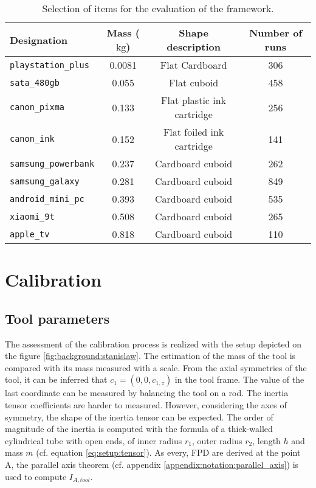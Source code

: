 \documentclass[/home/francois/latex/report/main.tex]{subfiles}
\begin{document}
\begin{table}[h]
  \begin{center}
    \renewcommand{\arraystretch}{1.2} %
    \begin{tabular}{l|c|c|c} %
      \textbf{Designation} & \textbf{Mass ($\si{\kilogram}$)} & \textbf{Shape description} & \textbf{Number of runs}\\
      \hline
      \texttt{playstation\_plus}  & 0.0081 & Flat Cardboard & 306 \\
      \hline
      \texttt{sata\_480gb}  & 0.055 & Flat cuboid & 458\\
      \hline
      \texttt{canon\_pixma}  & 0.133 & Flat plastic ink cartridge & 256\\
      \hline
      \texttt{canon\_ink}  & 0.152 & Flat foiled ink cartridge & 141 \\
      \hline
      \texttt{samsung\_powerbank}  & 0.237 & Cardboard cuboid & 262\\
      \hline
      \texttt{samsung\_galaxy}  & 0.281 & Cardboard cuboid & 849 \\
      \hline
      \texttt{android\_mini\_pc}  & 0.393 & Cardboard cuboid & 535\\
      \hline
      \texttt{xiaomi\_9t}  & 0.508 & Cardboard cuboid & 265 \\
      \hline
      \texttt{apple\_tv}  & 0.818 & Cardboard cuboid & 110 \\
      \hline
    \end{tabular}
  \end{center}
  \caption{Selection of items for the evaluation of the framework.\label{tab:setup:items}}
\end{table}

\section{Calibration}

\subsection{Tool parameters}
\label{subsection:setup:calibration:tool}

The assessment of the calibration process is realized with the setup depicted on the figure \ref{fig:background:stanislaw}. The estimation of the mass of the tool is compared with its mass measured with a scale. From the axial symmetries of the tool, it can be inferred that $c_1 = (0, 0, c_{1,z})$ in the tool frame. The value of the last coordinate can be measured by balancing the tool on a rod. The inertia tensor coefficients are harder to measured. However, considering the axes of symmetry, the shape of the inertia tensor can be expected. The order of magnitude of the inertia is computed with the formula of a thick-walled cylindrical tube with open ends, of inner radius $r_1$, outer radius $r_2$, length $h$ and mass $m$ (cf. equation \ref{eq:setup:tensor}). As every, \ac{FPD} are derived at the point A, the parallel axis theorem (cf. appendix \ref{appendix:notation:parallel_axis}) is used to compute $I_{A, tool}$.
\end{document}
